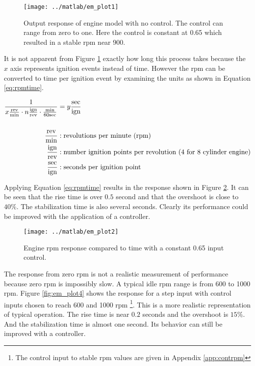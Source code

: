 \documentclass{article}
\begin{document}
\begin{figure}[htbp!]
\begin{center}
\texttt{[image: ../matlab/em\_plot1]}
\end{center}
\caption{Output response of engine model with no control.
The control can range from zero to one.
Here the control is constant at 0.65 which resulted in a stable
rpm near 900.}
\label{fig:em_plot}
\end{figure}

It is not apparent from Figure \ref{fig:em_plot} exactly how long
this process takes because the $x$ axis represents ignition events
instead of time.
However the rpm can be converted to time per ignition event by examining
the units as shown in Equation \ref{eq:rpmtime}.

\begin{align}
\frac{1}{x \frac{\text{rev}}{\text{min}}
			\cdot n \frac{\text{ign}}{\text{rev}}
			\cdot \frac{\text{min}}{60\text{sec}}
		}
&= y \frac{\text{sec}}{\text{ign}} \label{eq:rpmtime} \\
& \notag \\
	\frac{\text{rev}}{\text{min}} &: \text{revolutions per minute (rpm)} \notag \\
	\frac{\text{ign}}{\text{rev}} &: \text{number ignition points per revolution (4 for 8 cylinder engine)} \notag \\
	\frac{\text{sec}}{\text{ign}} &: \text{seconds per ignition point} \notag
\end{align}

Applying Equation \ref{eq:rpmtime} results in the response shown
in Figure \ref{fig:rpmtime_plot}.
It can be seen that the rise time is over $0.5$ second and
that the overshoot is close to $40\%$.
The stabilization time is also several seconds.
Clearly its performance could be improved with the application
of a controller.

\begin{figure}[htbp!]
\begin{center}
\texttt{[image: ../matlab/em\_plot2]}
\end{center}
\caption{Engine rpm response compared to time with a constant
0.65 input control.}
\label{fig:rpmtime_plot}
\end{figure}

The response from zero rpm is not a realistic measurement of performance
because zero rpm is impossibly slow.
A typical idle rpm range is from 600 to 1000 rpm.
Figure \ref{fig:em_plot4} shows the response for a step input
with control inputs chosen to reach 600 and 1000 rpm
\footnote{The control input to stable rpm values are given in
Appendix \ref{app:contrpm}}.
This is a more realistic representation of typical operation.
The rise time is near $0.2$ seconds and the overshoot is $15\%$.
And the stabilization time is almost one second.
Its behavior can still be improved with a controller.
\end{document}
